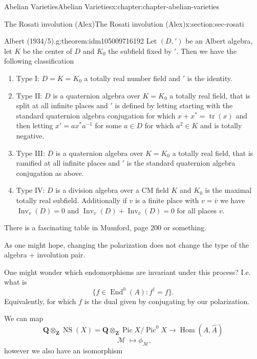 \documentclass[oneside,10pt,]{book}
\numberwithin{equation}{section}
\newcommand{\sheaf}[1]{\operatorname{\mathcal{#1}}}
\newcommand{\ZZ}{\mathbf{Z}}
\newcommand{\QQ}{\mathbf{Q}}
\DeclareMathOperator{\End}{End}
\DeclareMathOperator{\Hom}{Hom}
\DeclareMathOperator{\Pic}{Pic}
\DeclareMathOperator{\tr}{tr}
\DeclareMathOperator{\NS}{NS}
\begin{document}
\begin{chapterptx}{Abelian Varieties}{}{Abelian Varieties}{}{}{x:chapter:chapter-abelian-varieties}
\begin{sectionptx}{The Rosati involution (Alex)}{}{The Rosati involution (Alex)}{}{}{x:section:sec-rosati}
\begin{theorem}{Albert (1934\slash{}5).}{}{g:theorem:idm105009716192}%
Let \((D, ')\) be an Albert algebra, let \(K\) be the center of \(D\) and \(K_0\) the subfield fixed by \('\). Then we have the following classification%
\begin{enumerate}
\item{}Type I: \(D = K = K_0\) a totally real number field and \('\) is the identity.%
\item{}Type II: \(D\) is a quaternion algebra over \(K = K_0\) a totally real field, that is split at all infinite places and \('\) is defined by letting starting with the standard quaternion algebra conjugation for which \(x + x^* = \tr(x)\) and then letting \(x' = ax^* a^{-1}\) for some \(a \in D\) for which \(a^2 \in K\) and is totally negative.%
\item{}Type III: \(D\) is a quaternion algebra over \(K = K_0\) a totally real field, that is ramified at all infinite places and \('\) is the standard quaternion algebra conjugation as above.%
\item{}Type IV: \(D\) is a division algebra over a CM field \(K\) and \(K_0\) is the maximal totally real subfield. Additionally if \(v\) is a finite place with \(v = \bar v\) we have \(\operatorname{Inv}_v(D) = 0\) and \(\operatorname{Inv}_v(D) + \operatorname{Inv}_{\bar v}(D) = 0\) for all places \(v\).%
\end{enumerate}
%
\end{theorem}
There is a fascinating table in Mumford, page 200 or something.%
\par
As one might hope, changing the polarization does not change the type of the algebra + involution pair.%
\par
One might wonder which endomorphisms are invariant under this process? I.e. what is%
\begin{equation*}
\{f \in \End^0(A) : f^\dagger = f\}\text{.}
\end{equation*}
Equivalently, for which \(f\) is the dual given by conjugating by our polarization.%
\par
We can map%
\begin{equation*}
\QQ \otimes_\ZZ \NS(X) = \QQ \otimes_\ZZ \Pic X/\Pic^0 X \to \Hom(A, \hat A)
\end{equation*}
%
\begin{equation*}
\sheaf M \mapsto \phi_{\sheaf M}\text{,}
\end{equation*}
however we also have an isomorphism%
\begin{equation*}

\end{equation*}
\end{sectionptx}
\end{chapterptx}
\end{document}
